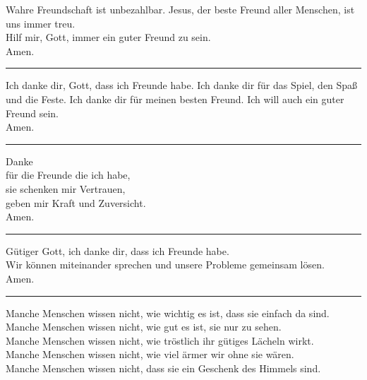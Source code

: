 Wahre  Freundschaft  ist  unbezahlbar.  Jesus,  der  beste  Freund  aller  Menschen,  ist  uns immer treu. \\
Hilf mir, Gott, immer ein guter Freund zu sein.\\ \newline
Amen.\\
\par\noindent\rule{\textwidth}{0.4pt} \newline \newline
Ich danke dir, Gott, dass ich Freunde habe. Ich danke dir für das Spiel, den Spaß und die Feste. Ich danke dir für meinen besten Freund. Ich will auch ein guter Freund sein. \\ \newline
Amen.\\
\par\noindent\rule{\textwidth}{0.4pt} \newline \newline
Danke\\
für die Freunde die ich habe, \\
sie schenken mir Vertrauen, \\
geben mir Kraft und Zuversicht. \\ \newline
Amen.\\
\par\noindent\rule{\textwidth}{0.4pt} \newline \newline
Gütiger Gott, ich danke dir, dass ich Freunde habe.\\ 
Wir können miteinander sprechen und unsere Probleme gemeinsam lösen. \\ \newline
Amen.\\
\par\noindent\rule{\textwidth}{0.4pt} \newline \newline
Manche Menschen wissen nicht, wie wichtig es ist, dass sie einfach da sind. \\
Manche Menschen wissen nicht, wie gut es ist, sie nur zu sehen. \\
Manche Menschen wissen nicht, wie tröstlich ihr gütiges Lächeln wirkt. \\
Manche Menschen wissen nicht, wie viel ärmer wir ohne sie wären. \\
Manche Menschen wissen nicht, dass sie ein Geschenk des Himmels sind.\\ \newline
